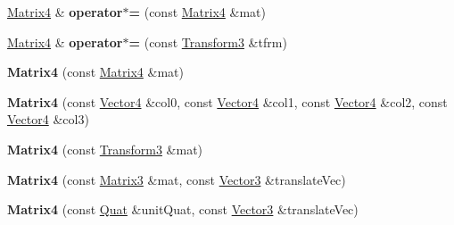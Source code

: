 \begin{DoxyCompactItemize}
\item 
\hypertarget{classVectormath_1_1Soa_1_1Matrix4_a63300e39f312d25a4ef193abe9988e4c}{\hyperlink{classVectormath_1_1Soa_1_1Matrix4}{Matrix4} \& {\bfseries operator$\ast$=} (const \hyperlink{classVectormath_1_1Soa_1_1Matrix4}{Matrix4} \&mat)}\label{classVectormath_1_1Soa_1_1Matrix4_a63300e39f312d25a4ef193abe9988e4c}

\item 
\hypertarget{classVectormath_1_1Soa_1_1Matrix4_a4adc18f2145be6c3e4cfd3dfd4115379}{\hyperlink{classVectormath_1_1Soa_1_1Matrix4}{Matrix4} \& {\bfseries operator$\ast$=} (const \hyperlink{classVectormath_1_1Soa_1_1Transform3}{Transform3} \&tfrm)}\label{classVectormath_1_1Soa_1_1Matrix4_a4adc18f2145be6c3e4cfd3dfd4115379}

\item 
\hypertarget{classVectormath_1_1Soa_1_1Matrix4_ae1130c2a12f99c3ff5800665ea47e661}{{\bfseries Matrix4} (const \hyperlink{classVectormath_1_1Soa_1_1Matrix4}{Matrix4} \&mat)}\label{classVectormath_1_1Soa_1_1Matrix4_ae1130c2a12f99c3ff5800665ea47e661}

\item 
\hypertarget{classVectormath_1_1Soa_1_1Matrix4_a7bef818cd4f69e0c2100b380b071babc}{{\bfseries Matrix4} (const \hyperlink{classVectormath_1_1Soa_1_1Vector4}{Vector4} \&col0, const \hyperlink{classVectormath_1_1Soa_1_1Vector4}{Vector4} \&col1, const \hyperlink{classVectormath_1_1Soa_1_1Vector4}{Vector4} \&col2, const \hyperlink{classVectormath_1_1Soa_1_1Vector4}{Vector4} \&col3)}\label{classVectormath_1_1Soa_1_1Matrix4_a7bef818cd4f69e0c2100b380b071babc}

\item 
\hypertarget{classVectormath_1_1Soa_1_1Matrix4_a0d8bffb261541bba7711dc4c38b782ad}{{\bfseries Matrix4} (const \hyperlink{classVectormath_1_1Soa_1_1Transform3}{Transform3} \&mat)}\label{classVectormath_1_1Soa_1_1Matrix4_a0d8bffb261541bba7711dc4c38b782ad}

\item 
\hypertarget{classVectormath_1_1Soa_1_1Matrix4_a0abd8564e08b2960e0be1274b0eab06c}{{\bfseries Matrix4} (const \hyperlink{classVectormath_1_1Soa_1_1Matrix3}{Matrix3} \&mat, const \hyperlink{classVectormath_1_1Soa_1_1Vector3}{Vector3} \&translate\-Vec)}\label{classVectormath_1_1Soa_1_1Matrix4_a0abd8564e08b2960e0be1274b0eab06c}

\item 
\hypertarget{classVectormath_1_1Soa_1_1Matrix4_a8410f058e71915d4d0d97c0e86f2d4c6}{{\bfseries Matrix4} (const \hyperlink{classVectormath_1_1Soa_1_1Quat}{Quat} \&unit\-Quat, const \hyperlink{classVectormath_1_1Soa_1_1Vector3}{Vector3} \&translate\-Vec)}\label{classVectormath_1_1Soa_1_1Matrix4_a8410f058e71915d4d0d97c0e86f2d4c6}


\end{DoxyCompactItemize}
